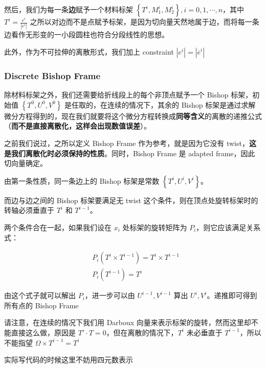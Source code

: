 \documentclass{notes}
\begin{document}
然后，我们为每一条\textbf{边}赋予一个材料标架 $\left\lbrace T^i, M_1^i, M_2^i \right\rbrace, i = 0, 1, \cdots, n$，其中 $T^i = \frac{e^i}{\left|e^i\right|}$  之所以对边而不是点赋予标架，是因为切向量天然地属于边，而将每一条边看作无形变的一小段圆柱也符合分段线性的思想。

此外，作为不可拉伸的离散形式，我们加上 constraint $\left|e^i\right| = \left|\overline{e}^{i}\right|$

\subsubsection{Discrete Bishop Frame}

除材料标架之外，我们还需要给折线段上的每个非顶点赋予一个 Bishop 标架，初始值 $\left\lbrace T^0, U^0, V^0 \right\rbrace$ 是任取的，在连续的情况下，其余的 Bishop 标架是通过求解微分方程得到的，现在我们就要将这个微分方程转换成\textbf{同等含义}的离散的递推公式（\textbf{而不是直接离散化，这样会出现数值误差}）。

之前我们说过，之所以定义 Bishop Frame 作为参考，就是因为它没有 twist，\textbf{这是我们离散化时必须保持的性质}。同时，Bishop Frame 是 adapted frame，因此切向量确定。

由第一条性质，同一条边上的 Bishop 标架是常数 $\left\lbrace T^i, U^i, V^i \right\rbrace$。

而边与边之间的 Bishop 标架要满足无 twist 这个条件，则在顶点处旋转标架时的转轴必须垂直于 $T^i$ 和 $T^{i - 1}$。

两个条件合在一起，如果我们设在 $x_i$ 处标架的旋转矩阵为 $P_i$，则它应该满足关系式：

\begin{equation}
	\begin{aligned}
		&P_i(T^i \times T^{i - 1}) = T^i \times T^{i - 1} \\
		&P_i(T^{i - 1}) = T^i
	\end{aligned}
\end{equation}

由这个式子就可以解出 $P_i$，进一步可以由 $U^{i - 1}, V^{i - 1}$ 算出 $U^i, V^i$。递推即可得到所有点的 Bishop Frame

\begin{remark}
	请注意，在连续的情况下我们用 Darboux 向量来表示标架的旋转，然而这里却不能直接这么做，原因是 $T' \cdot T = 0$，但在离散的情况下，$T^{i}$ 未必垂直于 $T^{i - 1}$，所以不能指望 $\Omega \times T^{i - 1} = T^i$
\end{remark}

\begin{remark}
	实际写代码的时候这里不妨用四元数表示
\end{remark}
\end{document}
